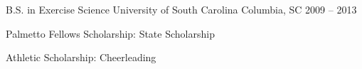 

\begin{cventries}
  \cventry
    {B.S. in Exercise Science} %
    {University of South Carolina} %
    {Columbia, SC} %
    {2009 -- 2013} %
    {
      \begin{cvitems} %
        \item {Palmetto Fellows Scholarship: State Scholarship}
        \item {Athletic Scholarship: Cheerleading}
      \end{cvitems}
    }
\end{cventries}